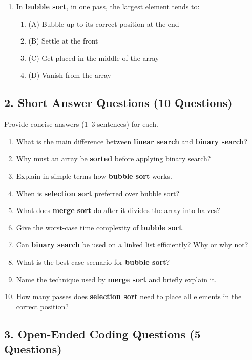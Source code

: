 \documentclass[a4paper,12pt]{article}
\begin{document}
\begin{enumerate}
    \item In \textbf{bubble sort}, in one pass, the largest element tends to:
    \begin{enumerate}
        \item (A) Bubble up to its correct position at the end
        \item (B) Settle at the front
        \item (C) Get placed in the middle of the array
        \item (D) Vanish from the array
    \end{enumerate}
\end{enumerate}

\newpage
\subsection{2. Short Answer Questions (10 Questions)}
Provide concise answers (1--3 sentences) for each.

\begin{enumerate}
    \item What is the main difference between \textbf{linear search} and \textbf{binary search}?
    \item Why must an array be \textbf{sorted} before applying binary search?
    \item Explain in simple terms how \textbf{bubble sort} works.
    \item When is \textbf{selection sort} preferred over bubble sort?
    \item What does \textbf{merge sort} do after it divides the array into halves?
    \item Give the worst-case time complexity of \textbf{bubble sort}.
    \item Can \textbf{binary search} be used on a linked list efficiently? Why or why not?
    \item What is the best-case scenario for \textbf{bubble sort}?
    \item Name the technique used by \textbf{merge sort} and briefly explain it.
    \item How many passes does \textbf{selection sort} need to place all elements in the correct position?
\end{enumerate}

\newpage
\subsection{3. Open-Ended Coding Questions (5 Questions)}
\end{document}
